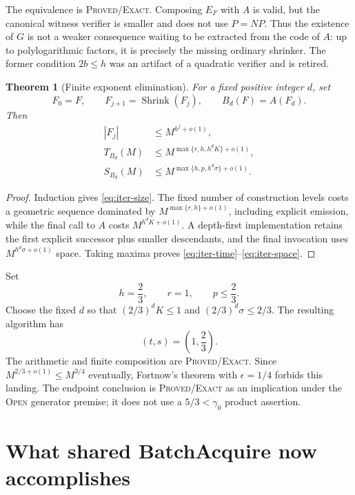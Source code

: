 \documentclass[11pt]{article}
\newtheorem{theorem}{Theorem}[section]
\newcommand{\Exact}{\textsc{Proved/Exact}}
\newcommand{\Open}{\textsc{Open}}
\begin{document}
The equivalence is \Exact.  Composing $E_F$ with $A$ is valid, but the
canonical witness verifier is smaller and does not use $P=NP$.  Thus the
existence of $G$ is not a weaker consequence waiting to be extracted from
the code of $A$: up to polylogarithmic factors, it is precisely the missing
ordinary shrinker.  The former condition $2b\le h$ was an artifact of a
quadratic verifier and is retired.

\begin{theorem}[Finite exponent elimination]
For a fixed positive integer $d$, set
\[
 F_0=F,\qquad F_{j+1}=\operatorname{Shrink}(F_j),
 \qquad B_d(F)=A(F_d).
\]
Then
\begin{align}
 |F_j|&\le M^{h^j+o(1)},\label{eq:iter-size}\\
 T_{B_d}(M)&\le
 M^{\max\{r,h,h^dK\}+o(1)},\label{eq:iter-time}\\
 S_{B_d}(M)&\le M^{\max\{h,p,h^d\sigma\}+o(1)}.
 \label{eq:iter-space}
\end{align}
\end{theorem}

\begin{proof}
Induction gives \eqref{eq:iter-size}.  The fixed number of construction
levels costs a geometric sequence dominated by
$M^{\max\{r,h\}+o(1)}$, including explicit emission, while the final call to
$A$ costs $M^{h^dK+o(1)}$.  A depth-first implementation retains the first
explicit successor plus smaller descendants, and the final invocation uses
$M^{h^d\sigma+o(1)}$ space.  Taking maxima proves
\eqref{eq:iter-time}--\eqref{eq:iter-space}.
\end{proof}

Set
\begin{equation}
 h=\frac23,\qquad r=1,\qquad p\le\frac23.
 \label{eq:landing-params}
\end{equation}
Choose the fixed $d$ so that
$(2/3)^dK\le1$ and $(2/3)^d\sigma\le2/3$.  The resulting algorithm has
\[
 (t,s)=\left(1,\frac23\right).
\]
The arithmetic and finite composition are \Exact.  Since
$M^{2/3+o(1)}\le M^{3/4}$ eventually, Fortnow's theorem with
$\epsilon=1/4$ forbids this landing.  The endpoint conclusion is
\Exact{} as an implication under the \Open{} generator premise; it does not use a
$5/3<\gamma_0$ product assertion.

\section{What shared BatchAcquire now accomplishes}
\end{document}
